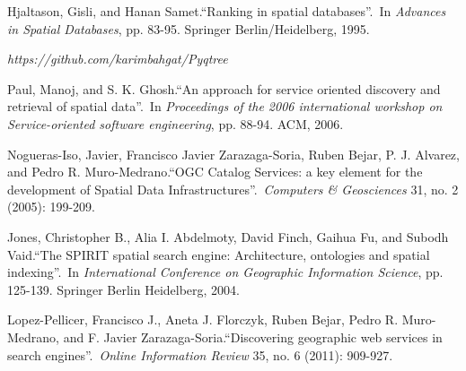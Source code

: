 \begin{thebibliography}{5}
Hjaltason, Gisli, and Hanan Samet.\textquotedblleft Ranking in spatial databases\textquotedblright.\ In \textit{Advances in Spatial Databases}, pp. 83-95. Springer Berlin/Heidelberg, 1995.

\textit{https://github.com/karimbahgat/Pyqtree}

Paul, Manoj, and S. K. Ghosh.\textquotedblleft An approach for service oriented discovery and retrieval of spatial data\textquotedblright.\ In \textit{Proceedings of the 2006 international workshop on Service-oriented software engineering}, pp. 88-94. ACM, 2006.

Nogueras-Iso, Javier, Francisco Javier Zarazaga-Soria, Ruben Bejar, P. J. Alvarez, and Pedro R. Muro-Medrano.\textquotedblleft OGC Catalog Services: a key element for the development of Spatial Data Infrastructures\textquotedblright.\ \textit{Computers \& Geosciences} 31, no. 2 (2005): 199-209.

Jones, Christopher B., Alia I. Abdelmoty, David Finch, Gaihua Fu, and Subodh Vaid.\textquotedblleft The SPIRIT spatial search engine: Architecture, ontologies and spatial indexing\textquotedblright.\ In \textit{International Conference on Geographic Information Science}, pp. 125-139. Springer Berlin Heidelberg, 2004.

Lopez-Pellicer, Francisco J., Aneta J. Florczyk, Ruben Bejar, Pedro R. Muro-Medrano, and F. Javier Zarazaga-Soria.\textquotedblleft Discovering geographic web services in search engines\textquotedblright.\ \textit{Online Information Review} 35, no. 6 (2011): 909-927.

\end{thebibliography}

